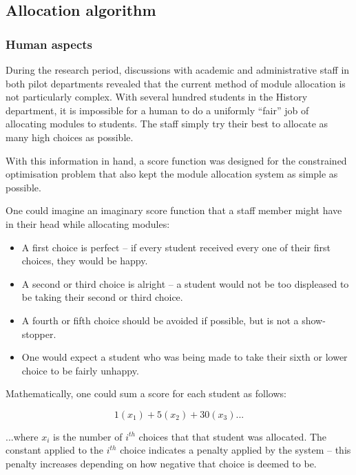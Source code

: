 
\subsection{Allocation algorithm}


\subsubsection{Human aspects}

During the research period, discussions with academic and administrative staff
in both pilot departments revealed that the current method of module
allocation is not particularly complex. With several hundred students in the
History department, it is impossible for a human to do a uniformly ``fair''
job of allocating modules to students. The staff simply try their best to
allocate as many high choices as possible.

With this information in hand, a score function was designed for the
constrained optimisation problem that also kept the module allocation system
as simple as possible.

One could imagine an imaginary score function that a staff member might have
in their head while allocating modules:

\begin{itemize}
  \item A first choice is perfect -- if every student received every one of
        their first choices, they would be happy.
  \item A second or third choice is alright -- a student would not be too
        displeased to be taking their second or third choice.
  \item A fourth or fifth choice should be avoided if possible, but is not a
        show-stopper.
  \item One would expect a student who was being made to take their sixth or
        lower choice to be fairly unhappy.
\end{itemize}

Mathematically, one could sum a score for each student as follows:

$$
1(x_1) + 5(x_2) + 30(x_3) ...
$$

...where $x_i$ is the number of $i^{th}$ choices that that student was
allocated. The constant applied to the $i^{th}$ choice indicates a penalty
applied by the system -- this penalty increases depending on how negative that
choice is deemed to be.

